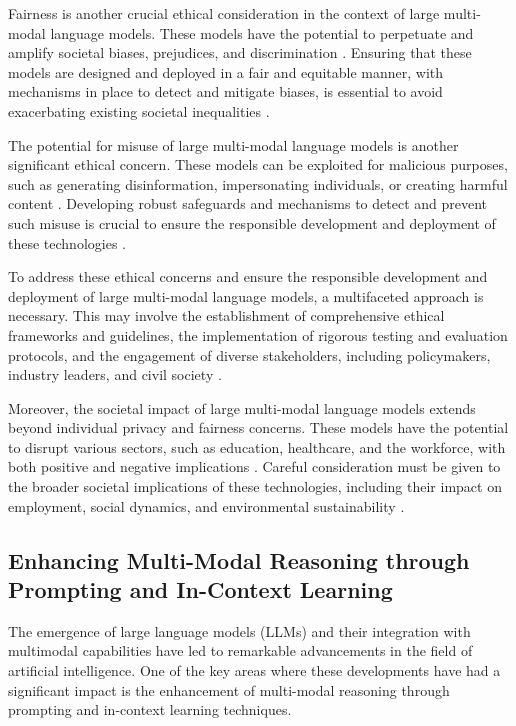 \documentclass[11pt]{article}
\begin{document}
Fairness is another crucial ethical consideration in the context of large multi-modal language models. These models have the potential to perpetuate and amplify societal biases, prejudices, and discrimination \cite{ref82,ref83}. Ensuring that these models are designed and deployed in a fair and equitable manner, with mechanisms in place to detect and mitigate biases, is essential to avoid exacerbating existing societal inequalities \cite{ref84}.

The potential for misuse of large multi-modal language models is another significant ethical concern. These models can be exploited for malicious purposes, such as generating disinformation, impersonating individuals, or creating harmful content \cite{ref85,ref86}. Developing robust safeguards and mechanisms to detect and prevent such misuse is crucial to ensure the responsible development and deployment of these technologies \cite{ref87}.

To address these ethical concerns and ensure the responsible development and deployment of large multi-modal language models, a multifaceted approach is necessary. This may involve the establishment of comprehensive ethical frameworks and guidelines, the implementation of rigorous testing and evaluation protocols, and the engagement of diverse stakeholders, including policymakers, industry leaders, and civil society \cite{ref88,ref89}.

Moreover, the societal impact of large multi-modal language models extends beyond individual privacy and fairness concerns. These models have the potential to disrupt various sectors, such as education, healthcare, and the workforce, with both positive and negative implications \cite{ref90}. Careful consideration must be given to the broader societal implications of these technologies, including their impact on employment, social dynamics, and environmental sustainability \cite{ref91}.

\subsection{Enhancing Multi-Modal Reasoning through Prompting and In-Context Learning}

The emergence of large language models (LLMs) and their integration with multimodal capabilities have led to remarkable advancements in the field of artificial intelligence. One of the key areas where these developments have had a significant impact is the enhancement of multi-modal reasoning through prompting and in-context learning techniques.
\end{document}
